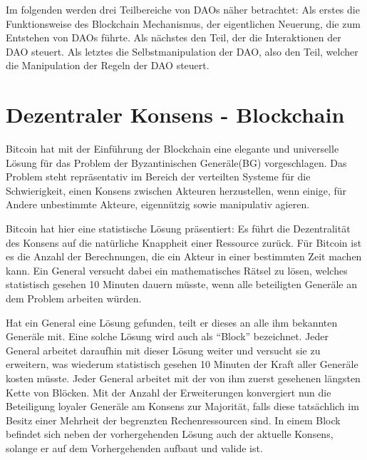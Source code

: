 \documentclass[a4paper,12pt]{report}
\begin{document}
Im folgenden werden drei Teilbereiche von DAOs näher betrachtet: Als erstes die Funktionsweise des Blockchain Mechanismus, der eigentlichen Neuerung, die zum Entstehen von DAOs führte. Als nächstes den Teil, der die Interaktionen der DAO steuert. Als letztes die Selbstmanipulation der DAO, also den Teil, welcher die Manipulation der Regeln der DAO steuert.


\section{Dezentraler Konsens - Blockchain}
\label{blockchain}

Bitcoin hat mit der Einführung der Blockchain eine elegante und universelle Lösung für das Problem der Byzantinischen Generäle(BG) vorgeschlagen. Das Problem steht repräsentativ im Bereich der verteilten Systeme für die Schwierigkeit, einen Konsens zwischen Akteuren herzustellen, wenn einige, für Andere unbestimmte Akteure, eigennützig sowie manipulativ agieren. 

Bitcoin hat hier eine statistische Lösung präsentiert: Es führt die Dezentralität des Konsens auf die natürliche Knappheit einer Ressource zurück. Für Bitcoin ist es die Anzahl der Berechnungen, die ein Akteur in einer bestimmten Zeit machen kann. Ein General versucht dabei ein mathematisches Rätsel zu lösen, welches statistisch gesehen 10 Minuten dauern müsste, wenn alle beteiligten Generäle an dem Problem arbeiten würden.


Hat ein General eine Lösung gefunden, teilt er dieses an alle ihm bekannten Generäle mit. Eine solche Lösung wird auch als ``Block'' bezeichnet. Jeder General arbeitet daraufhin mit dieser Lösung weiter und versucht sie zu erweitern, was wiederum statistisch gesehen 10 Minuten der Kraft aller Generäle kosten müsste. Jeder General arbeitet mit der von ihm zuerst gesehenen längsten Kette von Blöcken. Mit der Anzahl der Erweiterungen konvergiert nun die Beteiligung loyaler Generäle am Konsens zur Majorität, falls diese tatsächlich im Besitz einer Mehrheit der begrenzten Rechenressourcen sind.
In einem Block befindet sich neben der vorhergehenden Lösung auch der aktuelle Konsens, solange er auf dem Vorhergehenden aufbaut und valide ist.
\end{document}
